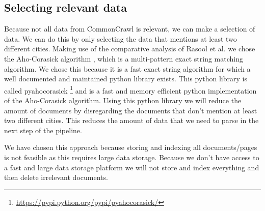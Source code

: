 \subsection{Selecting relevant data}
Because not all data from  CommonCrawl is relevant, we can make a selection of data. We can do this by only selecting the data that mentions at least two different cities. Making use of the comparative analysis of Rasool et al. \cite{rasool2012string} we chose the Aho-Corasick algorithm \cite{Aho-Corasick}, which is a multi-pattern exact string matching algorithm. We chose this because it is a fast exact string algorithm for which a well documented and maintained python library exists. This python library is called pyahocorasick \footnote{\url{https://pypi.python.org/pypi/pyahocorasick/}}  and is a fast and memory efficient python implementation of the Aho-Corasick algorithm. Using this python library we will reduce the amount of documents by disregarding the documents that don't mention at least two different cities. This reduces the amount of data that we need to parse in the next step of the pipeline.

We have chosen this approach because storing and indexing all documents/pages is not feasible as this requires large data storage. Because we don't have access to a fast and large data storage platform we will not store and index everything and then delete irrelevant documents.
